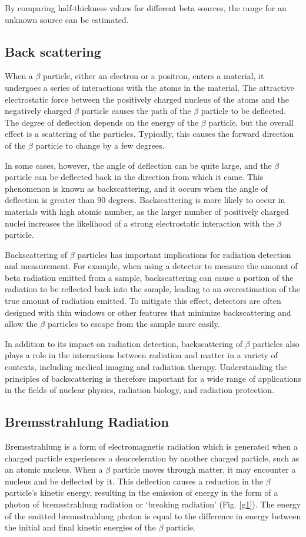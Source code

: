 By comparing half-thickness values for different beta sources,
the range for an unknown source can be estimated.

\subsection{Back scattering}
When a $\beta$ particle, either an electron or a positron, enters a material, it undergoes a series of interactions with the atoms in the material. The attractive electrostatic force between the positively charged nucleus of the atoms and the negatively charged $\beta$ particle causes the path of the $\beta$ particle to be deflected. The degree of deflection depends on the energy of the $\beta$ particle, but the overall effect is a scattering of the particles. Typically, this causes the forward direction of the $\beta$ particle to change by a few degrees.

In some cases, however, the angle of deflection can be quite large, and the $\beta$ particle can be deflected back in the direction from which it came. This phenomenon is known as backscattering, and it occurs when the angle of deflection is greater than 90 degrees. Backscattering is more likely to occur in materials with high atomic number, as the larger number of positively charged nuclei increases the likelihood of a strong electrostatic interaction with the $\beta$ particle.

Backscattering of $\beta$ particles has important implications for radiation detection and measurement. For example, when using a detector to measure the amount of beta radiation emitted from a sample, backscattering can cause a portion of the radiation to be reflected back into the sample, leading to an overestimation of the true amount of radiation emitted. To mitigate this effect, detectors are often designed with thin windows or other features that minimize backscattering and allow the $\beta$ particles to escape from the sample more easily.

In addition to its impact on radiation detection, backscattering of $\beta$ particles also plays a role in the interactions between radiation and matter in a variety of contexts, including medical imaging and radiation therapy. Understanding the principles of backscattering is therefore important for a wide range of applications in the fields of nuclear physics, radiation biology, and radiation protection.

\subsection{Bremsstrahlung Radiation}
Bremsstrahlung is a form of electromagnetic radiation which is generated when a charged particle experiences a deacceleration by another charged particle, such as an atomic nucleus. When a $\beta$ particle moves through matter, it may encounter a nucleus and be deflected by it. This deflection causes a reduction in the $\beta$ particle's kinetic energy, resulting in the emission of energy in the form of a photon of bremsstrahlung radiation or `breaking radiation' (Fig. \ref{g1}). The energy of the emitted bremsstrahlung photon is equal to the difference in energy between the initial and final kinetic energies of the $\beta$ particle.

